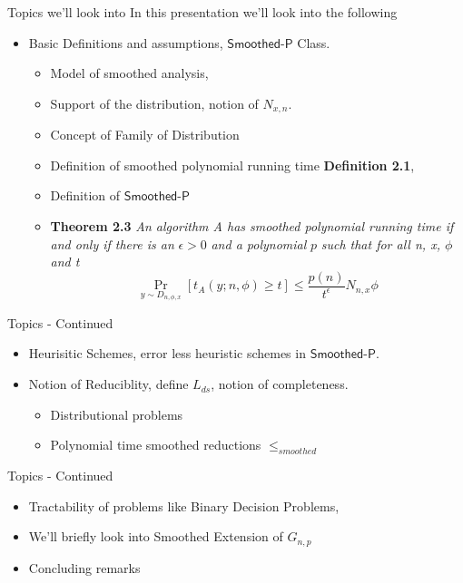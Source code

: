 \begin{frame}{Topics we'll look into}
    In this presentation we'll look into the following
    \begin{itemize}
        \item Basic Definitions and assumptions, $\textsf{Smoothed-P}$ Class.
            \begin{itemize}
                \item Model of smoothed analysis,
                \item Support of the distribution, notion of $N_{x, n}$.
                \item Concept of Family of Distribution
                \item Definition of smoothed polynomial running time \textbf{Definition 2.1},
                \item Definition of $\textsf{Smoothed-P}$
                \item \textbf{Theorem 2.3} \textit{An algorithm A has smoothed polynomial running time if and only if there is an} $\epsilon > 0$ \textit{and a polynomial} $p$ \textit{such that for all n, x, $\phi$ and t} $$\Pr_{y \sim D_{n, \phi, x}}[t_A(y; n, \phi) \geq t] \leq \frac{p(n)}{t^\epsilon} N_{n, x} \phi$$
            \end{itemize}
    \end{itemize}

\end{frame}

\begin{frame}{Topics - Continued}
    \begin{itemize}
        \item Heurisitic Schemes, error less heuristic schemes in $\textsf{Smoothed-P}$.
        \item Notion of Reduciblity, define $L_{ds}$, notion of completeness.
            \begin{itemize}
                \item Distributional problems
                \item Polynomial time smoothed reductions $\leq_{smoothed}$
            \end{itemize}
    \end{itemize}
\end{frame}


\begin{frame}{Topics - Continued}
    \begin{itemize}
        \item Tractability of problems like Binary Decision Problems,
        \item We'll briefly look into Smoothed Extension of $G_{n, p}$
        \item Concluding remarks
    \end{itemize}
\end{frame}